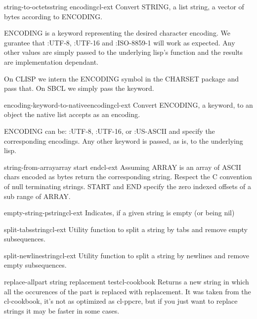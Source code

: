 \begin{function}{string-to-octets}{string encoding}{cl-ext}{}
  Convert STRING, a list string, a vector of bytes according to ENCODING.

ENCODING is a keyword representing the desired character
encoding. We gurantee that :UTF-8, :UTF-16 and :ISO-8859-1 will
work as expected. Any other values are simply passed to the
underlying lisp's function and the results are implementation
dependant.

On CLISP we intern the ENCODING symbol in the CHARSET package and
pass that. On SBCL we simply pass the keyword.
\end{function}

\begin{function}{encoding-keyword-to-native}{encoding}{cl-ext}{}
  Convert ENCODING, a keyword, to an object the native list
accepts as an encoding.

ENCODING can be: :UTF-8, :UTF-16, or :US-ASCII and specify the
corresponding encodings. Any other keyword is passed, as is, to
the underlying lisp.
\end{function}

\begin{function}{string-from-array}{array \key start end}{cl-ext}{}
  Assuming ARRAY is an array of ASCII chars encoded as bytes return
the corresponding string. Respect the C convention of null terminating
strings. START and END specify the zero indexed offsets of a sub range
of ARRAY.
\end{function}

\begin{function}{empty-string-p}{string}{cl-ext}{}
  Indicates, if a given string is empty (or being nil)
\end{function}

\begin{function}{split-tabs}{string}{cl-ext}{}
  Utility function to split a string by tabs and remove empty
  subsequences.
\end{function}

\begin{function}{split-newline}{string}{cl-ext}{}
  Utility function to split a string by newlines and remove empty
  subsequences.
\end{function}

\begin{function}{replace-all}{part string replacement \key test}{cl-cookbook}{}
  Returns a new string in which all the occurences of the part is
  replaced with replacement. It was taken from the cl-cookbook, it's
  not as optimized as cl-ppcre, but if you just want to replace
  strings it may be faster in some cases.
\end{function}
